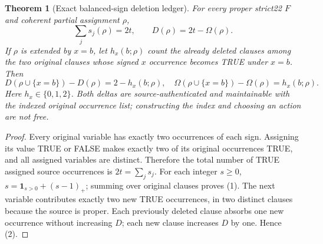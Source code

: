 \documentclass[10pt]{article}
\newtheorem{theorem}{Theorem}
\begin{document}
\begin{theorem}[Exact balanced-sign deletion ledger]
For every proper strict22 $F$ and coherent partial assignment $\rho$,
\[
 \boxed{\sum_j s_j(\rho)=2t,\qquad D(\rho)=2t-\Omega(\rho).}
\tag{1}
\]
If $\rho$ is extended by $x=b$, let $h_x(b;\rho)$ count the already deleted clauses among the \emph{two} original clauses whose signed $x$ occurrence becomes TRUE under $x=b$. Then
\[
 \boxed{D(\rho\cup\{x=b\})-D(\rho)=2-h_x(b;\rho),\quad
 \Omega(\rho\cup\{x=b\})-\Omega(\rho)=h_x(b;\rho).}
\tag{2}
\]
Here $h_x\in\{0,1,2\}$. Both deltas are source-authenticated and maintainable with the indexed original occurrence list; constructing the index and choosing an action are not free.
\end{theorem}
\begin{proof}
Every original variable has exactly two occurrences of each sign. Assigning its value TRUE or FALSE makes exactly two of its original occurrences TRUE, and all assigned variables are distinct. Therefore the total number of TRUE assigned source occurrences is $2t=\sum_j s_j$. For each integer $s\ge0$, $s=\mathbf1_{s>0}+(s-1)_+$; summing over original clauses proves (1). The next variable contributes exactly two new TRUE occurrences, in two distinct clauses because the source is proper. Each previously deleted clause absorbs one new occurrence without increasing $D$; each new clause increases $D$ by one. Hence (2).\end{proof}
\end{document}
